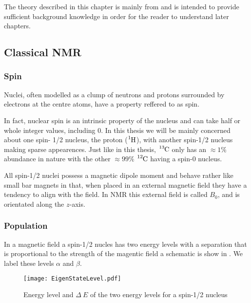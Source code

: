 The theory described in this chapter is mainly from \citep{RN135,RN136} and is intended to provide sufficient background
knowledge in order for the reader to understand later chapters.

\subsection{Classical NMR}

\subsubsection{Spin}

Nuclei, often modelled as a clump of neutrons and protons surrounded by electrons at
the centre atoms, have a property reffered to as spin.

In fact, nuclear spin is an intrinsic property of the nucleus and can take half or whole
integer values, including $0$. In this thesis we will be mainly concerned about one spin-
1/2 nucleus, the proton ($\ce{^{1}H}$), with another spin-1/2 nucleus  making
sparse appearences. Just like in this thesis, $\ce{^{13}C}$ only has an $\approx{1}\%$
abundance in nature with the other $\approx{99}\%$ $\ce{^{12}C}$ having a spin-$0$
nucleus.

All spin-1/2 nuclei possess a magnetic dipole moment and behave rather like small bar magnets in that, when placed in an external magnetic field they have a tendency to align
with the field. In NMR this external field is called $B_0$, and is orientated along the
$z$-axis.

\subsubsection{Population}\label{Population}

In a magnetic field a spin-1/2 nucles has two energy levels with a separation that is proportional to the strength of the magentic field a schematic is show in . We label these levels $\alpha$ and $\beta$.

\begin{figure}
  \begin{center}
  \texttt{[image: EigenStateLevel.pdf]}
  \end{center}
  \caption{Energy level and $\Delta~E$ of the two energy levels for a spin-1/2 nucleus}
  \label{fig:EnergySplit}
\end{figure}

